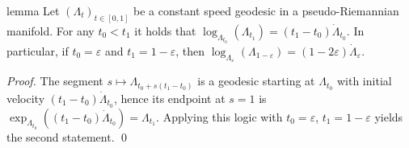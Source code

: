 \documentclass[11pt]{article}
\begin{document}
\begin{restatable}{lemma}{} \label{geodesic restriction log map}
    Let $(\Lambda_t)_{t \in [0,1]}$ be a constant speed geodesic in a pseudo-Riemannian manifold. For any $t_0 < t_1$ it holds that $\log_{\Lambda_{t_0}}(\Lambda_{t_1}) = (t_1 - t_0)\dot \Lambda_{t_0}$. In particular, if $t_0 = \varepsilon$ and $t_1 = 1 - \varepsilon$, then $\log_{\Lambda_\varepsilon}(\Lambda_{1 - \varepsilon}) = (1 - 2\varepsilon)\dot \Lambda_\varepsilon$.
\end{restatable}
\noindent \textit{Proof.} The segment $s \mapsto \Lambda_{t_0 + s(t_1 - t_0)}$ is a geodesic starting at $\Lambda_{t_0}$ with initial velocity $(t_1 - t_0)\dot \Lambda_{t_0}$, hence its endpoint at $s = 1$ is $\exp_{\Lambda_{t_0}}((t_1 - t_0)\dot \Lambda_{t_0}) = \Lambda_{t_1}$. Applying this logic with $t_0 = \varepsilon$, $t_1 = 1- \varepsilon$ yields the second statement.  \qed{}
\\
\end{document}
